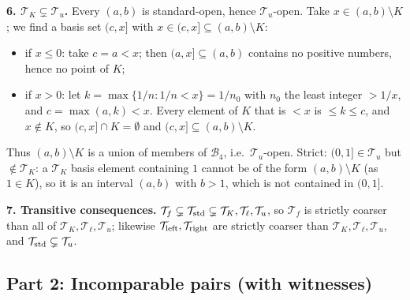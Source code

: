 \documentclass[11pt]{article}
\newcommand{\T}{\mathcal{T}}
\begin{document}
\textbf{6. $\T_K\subsetneq\T_u$.} Every $(a,b)$ is standard-open, hence $\T_u$-open. Take $x\in(a,b)\setminus K$; we find a basis set $(c,x]$ with $x\in(c,x]\subseteq(a,b)\setminus K$:
\begin{itemize}[nosep]
\item if $x\le0$: take $c=a<x$; then $(a,x]\subseteq(a,b)$ contains no positive numbers, hence no point of $K$;
\item if $x>0$: let $k=\max\{1/n:1/n<x\}=1/n_0$ with $n_0$ the least integer $>1/x$, and $c=\max(a,k)<x$. Every element of $K$ that is $<x$ is $\le k\le c$, and $x\notin K$, so $(c,x]\cap K=\emptyset$ and $(c,x]\subseteq(a,b)\setminus K$.
\end{itemize}
Thus $(a,b)\setminus K$ is a union of members of $\mathcal B_4$, i.e.\ $\T_u$-open. Strict: $(0,1]\in\T_u$ but $\notin\T_K$: a $\T_K$ basis element containing $1$ cannot be of the form $(a,b)\setminus K$ (as $1\in K$), so it is an interval $(a,b)$ with $b>1$, which is not contained in $(0,1]$.

\textbf{7. Transitive consequences.} $\T_f\subsetneq\T_{\rm std}\subsetneq\T_K,\T_\ell,\T_u$, so $\T_f$ is strictly coarser than all of $\T_K,\T_\ell,\T_u$; likewise $\T_{\rm left},\T_{\rm right}$ are strictly coarser than $\T_K,\T_\ell,\T_u$, and $\T_{\rm std}\subsetneq\T_u$.

\subsection*{Part 2: Incomparable pairs (with witnesses)}
\end{document}
